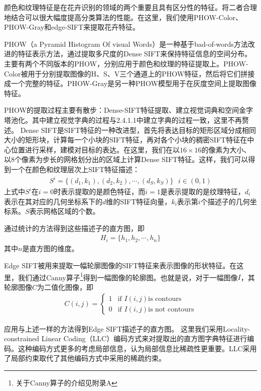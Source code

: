 \documentclass[supercite]{HustGraduPaper}
\begin{document}
\begin{sloppypar}
  颜色和纹理特征是在花卉识别的领域的两个重要且具有区分性的特征。将二者合理地结合可以很大幅度提高分类算法的性能。在这里，我们使用PHOW-Color、PHOW-Gray和edge-SIFT来提取花卉特征。

  PHOW（a Pyramid Histogram Of visual Words）是一种基于bad-of-words方法改进的特征表示方法，通过提取多尺度的Dense SIFT来保持特征信息的空间分布。主要有两个不同版本的PHOW，分别应用于颜色和纹理的特征提取上。PHOW-Color被用于分别提取图像的H、S、V三个通道上的PHOW特征，然后将它们拼接成一个完整的特征。PHOW-Gray是另一种PHOW模型用于在灰度空间上提取图像特征。

  PHOW的提取过程主要有散步：Dense-SIFT特征提取、建立视觉词典和空间金字塔池化。其中建立视觉字典的过程与2.4.1.1中建立字典的过程一致，这里不再赘述。
  Dense SIFT是SIFT特征的一种改进型，首先将表达目标的矩形区域分成相同大小的矩形块，计算每一个小块的SIFT特征，再对各个小块的稠密SIFT特征在中心位置进行采样，建模对目标的表达。在这里，我们在以$16\times16$的像素为大小、以8个像素为步长的网格划分出的区域上计算Dense SIFT特征。这样，我们可以得到一个在颜色和纹理层次上SIFT特征描述：\begin{gather}
     S^i=\{ (d_1,k_1),(d_2,k_2),\cdots,(d_S,k_S) \}\text{  }i\in(0,1)
  \end{gather}
  上式中$S^i$在$i=0$时表示提取的是颜色特征，而$i=1$是表示提取的是纹理特征，$d_i$表示在其对应的几何坐标系下的$d$维的SIFT特征向量，$k_i$表示第$i$个描述子的几何坐标系。$S$表示网格区域的个数。

  通过统计的方法得到这些描述子的直方图，即\begin{gather}
     H_i=\{h_1,h_2,\cdots,h_n\}
  \end{gather}
  其中$n$是直方图的维度。

  Edge SIFT被用来提取一幅轮廓图像的SIFT特征来表示图像的形状特征。在这里，我们通过Canny算子\footnote{关于Canny算子的介绍见附录A}得到一幅图像的轮廓图。也就是说，对于一幅图像$I$，其轮廓图像$C$为二值化图像，即\begin{gather}
    C(i,j)=\left\{
    \begin{array}{ll}
     1&\text{if }I(i,j)\text{is contours}\\
     0&\text{if }I(i,j)\text{is not contours}
    \end{array}
    \right.
  \end{gather}
  
  应用与上述一样的方法得到Edge SIFT描述子的直方图。
  这里我们采用Locality-constrained Linear Coding（LLC）编码方式来对提取出的直方图字典特征进行编码。这种编码方式更多的考虑局部信息，认为局部信息比稀疏性更重要。LLC采用了局部约束取代了其他编码方式中采用的稀疏约束\cite{5540018}。
  

\end{sloppypar}
\end{document}
